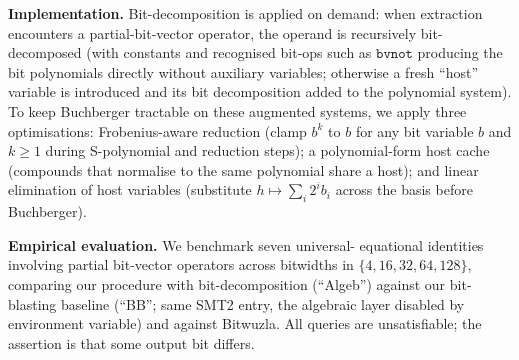 \documentclass[runningheads]{llncs}
\begin{document}
\textbf{Implementation.} Bit-decomposition is applied
on demand: when extraction encounters a partial-bit-vector
operator, the operand is recursively bit-decomposed (with
constants and recognised bit-ops such as $\mathtt{bvnot}$
producing the bit polynomials directly without auxiliary
variables; otherwise a fresh ``host'' variable is introduced and
its bit decomposition added to the polynomial system). To keep
Buchberger tractable on these augmented systems, we apply three
optimisations: Frobenius-aware reduction (clamp $b^k$ to $b$ for
any bit variable $b$ and $k \geq 1$ during S-polynomial and
reduction steps); a polynomial-form host cache (compounds that
normalise to the same polynomial share a host); and linear
elimination of host variables (substitute $h \mapsto \sum_i 2^i b_i$
across the basis before Buchberger).

\textbf{Empirical evaluation.} We benchmark seven universal-
equational identities involving partial bit-vector operators
across bitwidths in $\{4, 16, 32, 64, 128\}$, comparing our
procedure with bit-decomposition (``Algeb'') against our
bit-blasting baseline (``BB''; same SMT2 entry, the algebraic
layer disabled by environment variable) and against
Bitwuzla. All queries are unsatisfiable; the assertion is that
some output bit differs.
\end{document}
